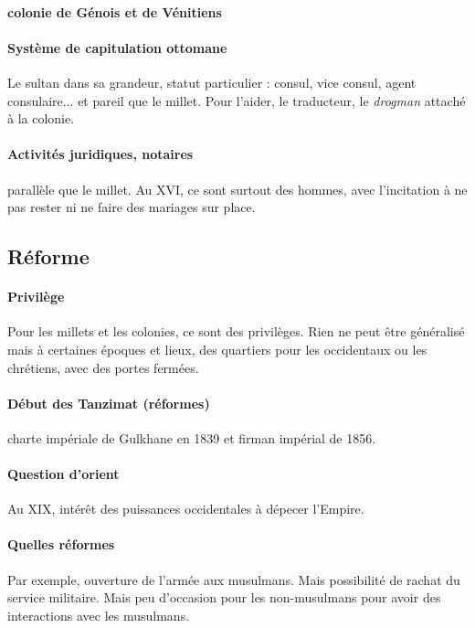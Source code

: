 \paragraph{colonie de Génois et de Vénitiens} 

\paragraph{Système de capitulation ottomane} Le sultan dans sa grandeur, statut particulier : consul, vice consul, agent consulaire... et pareil que le millet. Pour l'aider, le traducteur, le \textit{drogman} attaché à la colonie. 

\paragraph{Activités juridiques, notaires} parallèle que le millet. Au XVI, ce sont surtout des hommes, avec l'incitation à ne pas rester ni ne faire des mariages sur place.

\subsection{Réforme}
\paragraph{Privilège} Pour les millets et les colonies, ce sont des privilèges. Rien ne peut être généralisé mais à certaines époques et lieux, des quartiers pour les occidentaux ou les chrétiens, avec des portes fermées.

\paragraph{Début des Tanzimat (réformes)} charte impériale de Gulkhane en 1839 et firman impérial de 1856. 

\paragraph{Question d'orient} Au XIX, intérêt des puissances occidentales à dépecer l'Empire.

\paragraph{Quelles réformes} Par exemple, ouverture de l'armée aux musulmans. Mais possibilité de rachat du service militaire. Mais peu d'occasion pour les non-musulmans pour avoir des interactions avec les musulmans. 

